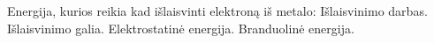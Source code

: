 Energija, kurios reikia kad išlaisvinti elektroną iš metalo:
Išlaisvinimo darbas.
Išlaisvinimo galia.
Elektrostatinė energija.
Branduolinė energija.